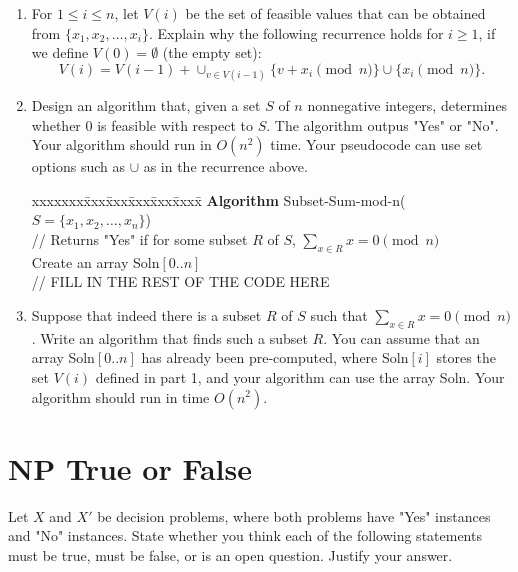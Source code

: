\documentclass[11pt]{article}
\def\question#1{\red{#1}}
\def\red#1{{\color{red}#1}}
\begin{document}
\begin{enumerate}
\item For $1 \le i \le n$, let $V(i)$ be the set of feasible values that can
be obtained from $\{x_1, x_2, \ldots, x_i\}$.
\question{Explain why the following recurrence holds for $i \ge 1$, if we define
$V(0) = \emptyset$ (the empty set):}
 \[
    V(i) = V(i-1) + \cup_{v \in V(i-1)} \{ v + x_i \pmod n \} \cup \{ x_i \pmod n \}.
    \]

\item \question{Design an algorithm that, given a set $S$ of $n$ nonnegative
integers, determines whether 0 is feasible with respect to $S$.} The
algorithm outpus "Yes" or "No".  Your algorithm should run in
$O(n^2)$ time. Your pseudocode can use set options such as $\cup$ as
in the recurrence above.

\begin{tabbing}
xxxxxxx\=xxx\=xxx\=xxx\=xxx\=xxxx\= \kill
\> {\bf Algorithm} Subset-Sum-mod-n($S = \{x_1,x_2,\ldots,x_n\}$) \\
\>\> // Returns "Yes" if for some subset $R$ of $S$, $\sum_{x \in R} x = 0 \pmod n$   \\
\>\> Create an array Soln$[0..n]$ \\
\>\> // FILL IN THE REST OF THE CODE HERE
\end{tabbing}

\item Suppose that indeed there is a subset $R$ of $S$ such that $\sum_{x
   \in R} x = 0 \pmod n$.  \question{Write an algorithm that finds such a subset
$R$}.  You can assume that an array Soln$[0..n]$ has already been
pre-computed, where Soln$[i]$ stores the set $V(i)$ defined in part 1,
and your algorithm can use the array Soln. Your algorithm should
run in time $O(n^2)$.
\end{enumerate}

\section{NP True or False}
\label{sec-2}
Let $X$ and $X'$ be decision problems, where both problems
have "Yes" instances and "No" instances.
\question{State whether you think each of the following statements must be true,
must be false, or is an open question. Justify your answer.}
\end{document}
